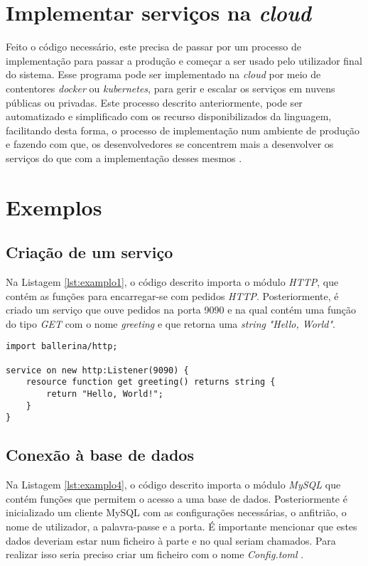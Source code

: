 \section{Implementar serviços na \textit{cloud}}
Feito o código necessário, este precisa de passar por um processo de implementação para passar a produção e começar a ser usado pelo utilizador final do sistema. Esse programa pode ser implementado na \textit{cloud} por meio de contentores \textit{docker} ou \textit{kubernetes}, para gerir e escalar os serviços em nuvens públicas ou privadas. Este processo descrito anteriormente, pode ser automatizado e simplificado com os recurso disponibilizados da linguagem, facilitando desta forma, o processo de implementação num ambiente de produção e fazendo com que, os desenvolvedores se concentrem mais a desenvolver os serviços do que com a implementação desses mesmos \cite{codeCloud}.

\section{Exemplos}
\subsection{Criação de um serviço}

Na Listagem \ref{lst:examplo1}, o código descrito importa o módulo \textit{HTTP}, que contém as funções para encarregar-se com pedidos \textit{HTTP}. Posteriormente, é criado um serviço que ouve pedidos na porta 9090 e na qual contém uma função do tipo \textit{GET} com o nome \textit{greeting} e que retorna uma \textit{string} \textit{"Hello, World"}.

\begin{minipage}{0.9\linewidth}
\begin{lstlisting}[language=ballerina, caption=Exemplo de um serviço. \cite{exemploB1}, label=lst:examplo1]
import ballerina/http;

service on new http:Listener(9090) {
    resource function get greeting() returns string {
        return "Hello, World!";
    }
}
\end{lstlisting}
\end{minipage}

\subsection{Conexão à base de dados}

Na Listagem \ref{lst:examplo4}, o código descrito importa o módulo \textit{MySQL} que contém funções que permitem o acesso a uma base de dados. Posteriormente é inicializado um cliente MySQL com as configurações necessárias, o anfitrião, o nome de utilizador, a palavra-passe e a porta. É importante mencionar que estes dados deveriam estar num ficheiro à parte e no qual seriam chamados. Para realizar isso seria preciso criar um ficheiro com o nome \textit{Config.toml} \cite{v}. 

